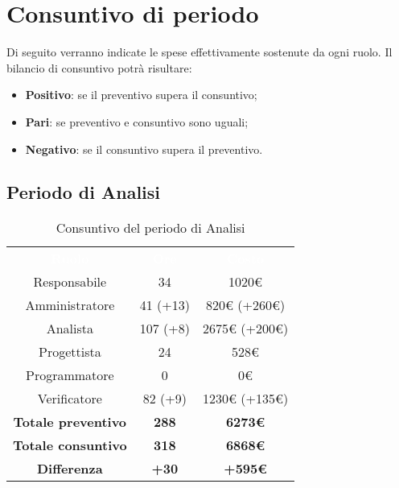 \section{Consuntivo di periodo}
Di seguito verranno indicate le spese effettivamente sostenute da ogni ruolo. Il bilancio di consuntivo potrà risultare: \begin{itemize}
\item \textbf{Positivo}: se il preventivo supera il consuntivo;
\item \textbf{Pari}: se preventivo e consuntivo sono uguali;
\item \textbf{Negativo}: se il consuntivo supera il preventivo.
\end{itemize}

\subsection{Periodo di Analisi}
\begin{table}[H]
\centering\renewcommand{\arraystretch}{1.5}
\caption{Consuntivo del periodo di Analisi}
\vspace{0.2cm}
\begin{tabular}{ c c c }
\rowcolor{redafk}
\textcolor{white}{\textbf{Ruolo}} & \textcolor{white}{\textbf{Ore}} & 
\textcolor{white}{\textbf{Costo}}  \\
Responsabile & 34 & 1020€ \\
Amministratore & 41 (+13) & 820€ (+260€) \\
Analista & 107 (+8) & 2675€ (+200€) \\
Progettista	& 24 & 528€  \\
Programmatore & 0 & 0€  \\
Verificatore & 82 (+9) & 1230€ (+135€)  \\
\textbf{Totale preventivo} & \textbf{288} & \textbf{6273€}  \\
\textbf{Totale consuntivo} & \textbf{318} & \textbf{6868€}  \\
\rowcolor{lastrowcolor}
\textbf{Differenza} & \textbf{+30} & \textbf{+595€}  \\
\end{tabular}
\end{table}

